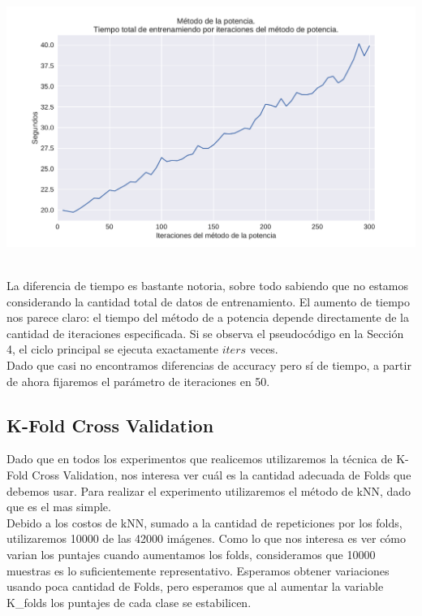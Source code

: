 {\centering
    \includegraphics[scale=0.55]{informe/imagenes/potencia/tiempoPorIters.pdf} \\
}
$ $\newline

La diferencia de tiempo es bastante notoria, sobre todo sabiendo que no estamos considerando la cantidad total de datos de entrenamiento. El aumento de tiempo nos parece claro: el tiempo del método de a potencia depende directamente de la cantidad de iteraciones especificada. Si se observa el pseudocódigo en la Sección 4, el ciclo principal se ejecuta exactamente $iters$ veces. \\

Dado que casi no encontramos diferencias de accuracy pero sí de tiempo, a partir de ahora fijaremos el parámetro de iteraciones en 50. \\

\newpage
\subsection{K-Fold Cross Validation}

Dado que en todos los experimentos que realicemos utilizaremos la técnica de K-Fold Cross Validation, nos interesa ver cuál es la cantidad adecuada de Folds que debemos usar. Para realizar el experimento utilizaremos el método de kNN, dado que es el mas simple. \\

Debido a los costos de kNN, sumado a la cantidad de repeticiones por los folds, utilizaremos 10000 de las 42000 imágenes. Como lo que nos interesa es ver cómo varian los puntajes cuando aumentamos los folds, consideramos que 10000 muestras es lo suficientemente representativo. Esperamos obtener variaciones usando poca cantidad de Folds, pero esperamos que al aumentar la variable K_folds los puntajes de cada clase se estabilicen. \\


